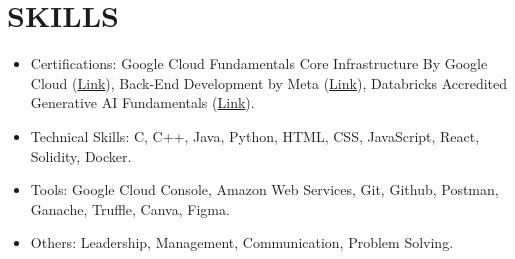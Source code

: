 \documentclass[a4paper,8pt]{article}
\begin{document}
\section{\textbf{SKILLS}}
\begin{minipage}[t]{\linewidth}
    \begin{itemize}[nosep,after=\strut, leftmargin=1em, itemsep=2pt]
        \item Certifications:
        Google Cloud Fundamentals Core Infrastructure By Google Cloud (\href{https://www.coursera.org/account/accomplishments/verify/FV8DSDL7DVVZ?utm_source=link&utm_medium=certificate&utm_content=cert_image&utm_campaign=sharing_cta&utm_product=course}{Link}), 
        Back-End Development by Meta (\href{https://www.coursera.org/account/accomplishments/verify/9S7N4TJ68C98?utm_source=link&utm_medium=certificate&utm_content=cert_image&utm_campaign=sharing_cta&utm_product=course}{Link}), 
        Databricks Accredited Generative AI Fundamentals (\href{https://credentials.databricks.com/c4992167-4627-41fd-998f-1a64555d43ff#acc.gc3NZh2P}{Link}).
        \item Technical Skills: C, C++, Java, Python, HTML, CSS, JavaScript, React, Solidity, Docker.
        \item Tools: Google Cloud Console, Amazon Web Services, Git, Github, Postman, Ganache, Truffle, Canva, Figma.
        \item Others: Leadership, Management, Communication, Problem Solving.
        \\
    \end{itemize}
\end{minipage}




\end{document}
